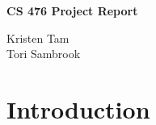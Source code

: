\documentclass{article}
\begin{document}
\begin{titlepage}

    \centering
    \vspace*{3cm}
    \huge\bfseries
    CS 476 Project Report
    \vspace{1cm}
   
    \large Kristen Tam \\ 
    \vspace{0.1cm}
    \large Tori Sambrook
    \vfill

\end{titlepage}

\newpage
\tableofcontents

\newpage
\section{Introduction}
\end{document}
